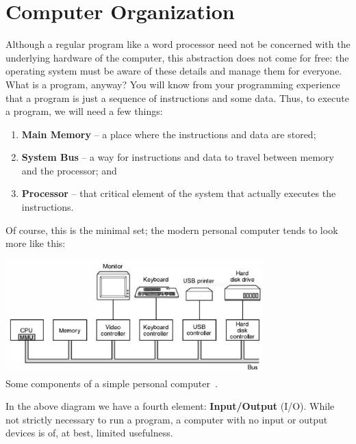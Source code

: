 




\section*{Computer Organization}
Although a regular program like a word processor need not be concerned with the underlying hardware of the computer, this abstraction does not come for free: the operating system must be aware of these details and manage them for everyone. What is a program, anyway? You will know from your programming experience that a program is just a sequence of instructions and some data. Thus, to execute a program, we will need a few things:

\begin{enumerate}
	\item \textbf{Main Memory} -- a place where the instructions and data are stored;
	\item \textbf{System Bus} -- a way for instructions and data to travel between memory and the processor; and
	\item \textbf{Processor} -- that critical element of the system that actually executes the instructions.
\end{enumerate}

Of course, this is the minimal set; the modern personal computer tends to look more like this:

\begin{center}
\includegraphics[width=0.75\textwidth]{images/modernpc.png}\\
Some components of a simple personal computer~\cite{mos}.
\end{center}

In the above diagram we have a fourth element: \textbf{Input/Output} (I/O). While not strictly necessary to run a program, a computer with no input or output devices is of, at best, limited usefulness.

